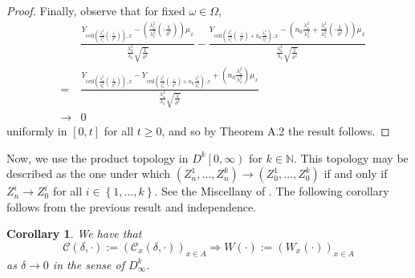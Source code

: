 \documentclass{wscpaperproc}
\theoremstyle{wsc}
\newtheorem{corollary}{Corollary}
\begin{document}
\begin{proof}
Finally, observe that for fixed $\omega\in\Omega$,
\begin{eqnarray*}
 &  & \frac{Y_{\mbox{ceil}\left(\frac{\lambda_{x}^{2}}{\lambda_{z}^{2}}\left(\cdot\frac{1}{\delta^{2}}\right)\right),x}-\mbox{}\left(\frac{\lambda_{x}^{2}}{\lambda_{z}^{2}}\left(\cdot\frac{1}{\delta^{2}}\right)\right)\mu_{x}}{\frac{\lambda_{x}^{2}}{\lambda_{z}}\sqrt{\frac{1}{\delta^{2}}}}-\frac{Y_{\mbox{ceil}\left(\frac{\lambda_{x}^{2}}{\lambda_{z}^{2}}\left(\cdot\frac{1}{\delta^{2}}\right)+n_{0}\frac{\lambda_{x}^{2}}{\lambda_{z}^{2}}\right),x}-\mbox{}\left(n_{0}\frac{\lambda_{x}^{2}}{\lambda_{z}^{2}}+\frac{\lambda_{x}^{2}}{\lambda_{z}^{2}}\left(\cdot\frac{1}{\delta^{2}}\right)\right)\mu_{x}}{\frac{\lambda_{x}^{2}}{\lambda_{z}}\sqrt{\frac{1}{\delta^{2}}}}\\
 & = & \frac{Y_{\mbox{ceil}\left(\frac{\lambda_{x}^{2}}{\lambda_{z}^{2}}\left(\cdot\frac{1}{\delta^{2}}\right)\right),x}-Y_{\mbox{ceil}\left(\frac{\lambda_{x}^{2}}{\lambda_{z}^{2}}\left(\cdot\frac{1}{\delta^{2}}\right)+n_{0}\frac{\lambda_{x}^{2}}{\lambda_{z}^{2}}\right),x}+\left(n_{0}\frac{\lambda_{x}^{2}}{\lambda_{z}^{2}}\right)\mu_{x}}{\frac{\lambda_{x}^{2}}{\lambda_{z}}\sqrt{\frac{1}{\delta^{2}}}}\\
 & \rightarrow & 0
\end{eqnarray*}
uniformly in $\left[0,t\right]$ for all $t\geq0$, and so by Theorem
A.2 the result follows.

\end{proof}


Now, we use the product topology in $D^{k}\left[0,\infty\right)$
for $k\in\mathbb{N}$. This topology may be described as the one under
which $\left(Z_{n}^{1},\ldots,Z_{n}^{k}\right)\rightarrow\left(Z_{0}^{1},\ldots,Z_{0}^{k}\right)$
if and only if $Z_{n}^{i}\rightarrow Z_{0}^{i}$ for all $i\in\left\{ 1,\ldots,k\right\} $.
See the Miscellany of  . The following corollary follows
from the previous result and independence.

\vspace{5mm}

\begin{corollary}
We have that
\[
\mathcal{C}\left(\delta,\cdot\right):=\left(\mathcal{C}_{x}\left(\delta,\cdot\right)\right)_{x\in A}\Rightarrow W\left(\cdot\right):=\left(W_{x}\left(\cdot\right)\right)_{x\in A}
\]
as $\delta\rightarrow0$ in the sense of $D_{\infty}^{k}$.
\end{corollary}

\vspace{5mm}
\end{document}
